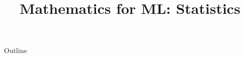 \documentclass[xcolor=dvipsnames,compress,t,pdf,9pt]{beamer}
\title[\insertframenumber /\inserttotalframenumber]{Mathematics for ML: Statistics}
\begin{document}
	\begin{frame}
	\titlepage
	\end{frame}

	\begin{frame}{Outline}
	    \tableofcontents
	\end{frame}

	
	
	
	
\end{document}
